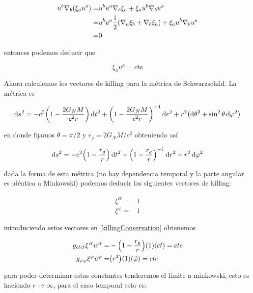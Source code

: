 \documentclass[../Main.tex]{subfiles}
\begin{document}
\begin{eqnarray*}
    u^{b}\nabla_{b}(\xi_{a}u^{a}) = & u^{b}u^{a}\nabla_{b}\xi_{a} + \xi_a u^{b}\nabla_{b}u^{a} \\
    = & u^{b}u^{a}\dfrac{1}{2}\qty(\nabla_{a}\xi_{b} + \nabla_{b}\xi_{a})+ \xi_a u^{b}\nabla_{b}u^{a} \\
    = & 0
\end{eqnarray*}

entonces podemos deducir que

\begin{equation}
    \xi_{a}u^{a} = cte
    \label{killingConservation}
\end{equation}

Ahora calculemos los vectores de killing para la métrica de Schwarzschild. La métrica es

\begin{equation}
    \dd{s}^{2} = -c^{2}\qty(1-\dfrac{2G_{N}M}{c^{2}r})\dd{t}^{2} + \qty(1-\dfrac{2G_{N}M}{c^{2}r})^{-1}\dd{r}^{2} + r^{2}\qty(\dd{\theta}^{2}+\sin^{2}{\theta}\dd{\varphi}^{2})
\end{equation}

en donde fijamos $\theta = \pi/2$ y $r_{g} = 2G_{N}M/c^{2}$ obteniendo así

\begin{equation}
    \dd{s}^{2} = -c^{2}\qty(1-\dfrac{r_{g}}{r})\dd{t}^{2} + \qty(1-\dfrac{r_{g}}{r})^{-1}\dd{r}^{2} + r^{2}\dd{\varphi}^{2}
\end{equation}

dada la forma de esta métrica (no hay dependencia temporal y la parte angular es idéntica a Minkowski) podemos deducir los siguientes vectores de killing:

\begin{eqnarray}
    \xi^{ct} = & 1 \\
    \xi^{\varphi} = & 1 
\end{eqnarray}

introduciendo estos vectores en \eqref{killingConservation} obtenemos

\begin{eqnarray}
    g_{ct ct}\xi^{ct}u^{ct} = & -\qty(1-\dfrac{r_{g}}{r})(1)(c\dot{t}) = cte \\
    g_{\varphi \varphi}\xi^{\varphi}u^{\varphi} = & \qty(r^{2})(1)(\dot{\varphi}) = cte 
\end{eqnarray}

para poder determinar estas constantes tenderemos el límite a minkowski, esto es haciendo $r \rightarrow \infty$, para el caso temporal esto es:
\end{document}
